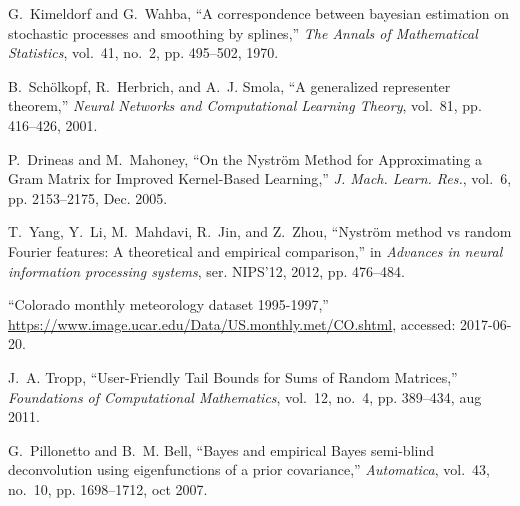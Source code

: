 \documentclass[10pt,twocolumn,twoside]{IEEEtran}					%
\theoremstyle	{plain}
\begin{document}
\begin{thebibliography}{10}
G.~Kimeldorf and G.~Wahba, ``A correspondence between bayesian estimation on
  stochastic processes and smoothing by splines,'' \emph{The Annals of
  Mathematical Statistics}, vol.~41, no.~2, pp. 495--502, 1970.

B.~Sch\"{o}lkopf, R.~Herbrich, and A.~J. Smola, ``A generalized representer
  theorem,'' \emph{Neural Networks and Computational Learning Theory}, vol.~81,
  pp. 416--426, 2001.

P.~Drineas and M.~Mahoney, ``{On the Nystr{\"o}m Method for Approximating a
  Gram Matrix for Improved Kernel-Based Learning},'' \emph{J. Mach. Learn.
  Res.}, vol.~6, pp. 2153--2175, Dec. 2005.

T.~Yang, Y.~Li, M.~Mahdavi, R.~Jin, and Z.~Zhou, ``{Nystr{\"o}m method vs
  random Fourier features: A theoretical and empirical comparison},'' in
  \emph{Advances in neural information processing systems}, ser. NIPS'12, 2012,
  pp. 476--484.

``Colorado monthly meteorology dataset 1995-1997,''
  \url{https://www.image.ucar.edu/Data/US.monthly.met/CO.shtml}, accessed:
  2017-06-20.

J.~A. Tropp, ``{User-Friendly Tail Bounds for Sums of Random Matrices},''
  \emph{Foundations of Computational Mathematics}, vol.~12, no.~4, pp.
  389--434, aug 2011.

G.~Pillonetto and B.~M. Bell, ``{Bayes and empirical Bayes semi-blind
  deconvolution using eigenfunctions of a prior covariance},''
  \emph{Automatica}, vol.~43, no.~10, pp. 1698--1712, oct 2007.

\end{thebibliography}
\end{document}

